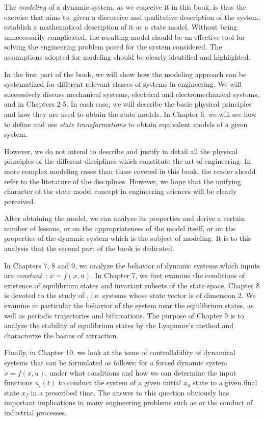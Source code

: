 The {\it modeling} of a dynamic system, as we conceive it in this book, is thus the exercise that aims to, given a discursive and qualitative description of the system, establish a mathematical description of it as a state model. Without being unnecessarily complicated, the resulting model should be an effective tool for solving the engineering problem posed for the system considered. The assumptions adopted for modeling should be clearly identified and highlighted.

In the first part of the book, we will show
how the modeling approach can be systematized for different
relevant classes of systems in engineering. We will successively discuss mechanical systems, electrical and electromechanical systems,
 and  in Chapters 2-5. In each case, we will 
describe the basic physical principles and how they are
used to obtain the state models. In Chapter 6, we will see how to define and use {\it state transformations} to obtain equivalent models of a given system.

However, we do not intend to describe and justify in detail all the physical principles of the different disciplines which constitute the art of engineering. In more complex modeling cases than those covered in this book, the reader should refer to the literature of the disciplines. However, we hope that the unifying character of the state model concept in engineering sciences will be clearly perceived.

After obtaining the model, we can analyze its properties and derive a certain number of lessons, or on the appropriateness of the model itself, or on the
properties of the dynamic system which is the subject of modeling. It is to this analysis that the second part of the book is dedicated.

In Chapters 7, 8 and 9, we analyze the behavior of dynamic systems which inputs are {\it constant}~: $\dot x= f(x,\bar u)$. In Chapter 7, we first examine the conditions of existence of equilibrium states and invariant subsets of the state space. Chapter 8 is devoted to the study of , i.e. systems whose state vector is of dimension 2. We examine in particular the behavior of the system near the equilibrium states, as well as periodic trajectories and bifurcations. The purpose of Chapter 9 is to analyze the stability of equilibrium states by the Lyapunov's method and characterize the basins of attraction.

Finally, in Chapter 10, we look at the issue of controllability of dynamical systems that can be formulated as follows: for a forced dynamic system $ \dot x = f(x,u)$, under what conditions and how we can determine the input functions $u_i(t)$ to conduct the system of a given initial $x_0$ state to a given final state $x_f$ in a prescribed time. The answer to this question obviously has important implications in many engineering problems such as  or the conduct of industrial processes.
\newpage
